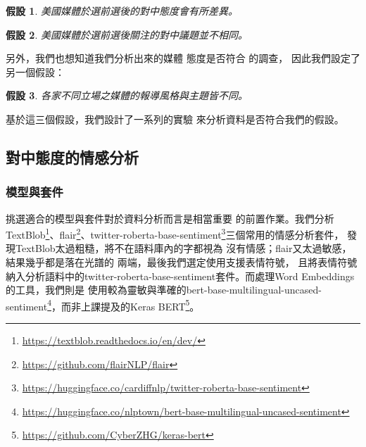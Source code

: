 \documentclass[12pt,twocolumn,letterpaper]{article}
\newtheorem{hyp}{假設}
\begin{document}
\begin{hyp}\label{hyp:attitude}
美國媒體於選前選後的對中態度會有所差異。
\end{hyp}
\begin{hyp}\label{hyp:topic}
美國媒體於選前選後關注的對中議題並不相同。
\end{hyp}

另外，我們也想知道我們分析出來的媒體
態度是否符合\cite{press} 的調查，
因此我們設定了另一個假設：
\begin{hyp}\label{hyp:press}
各家不同立場之媒體的報導風格與主題皆不同。
\end{hyp}

基於這三個假設，我們設計了一系列的實驗
來分析資料是否符合我們的假設。

\subsection{對中態度的情感分析}\label{subsec:sent}
\subsubsection{模型與套件}
挑選適合的模型與套件對於資料分析而言是相當重要
的前置作業。我們分析TextBlob\footnote{\url{https://textblob.readthedocs.io/en/dev/}}、flair\footnote{\url{https://github.com/flairNLP/flair}}、twitter-roberta-base-sentiment\footnote{\url{https://huggingface.co/cardiffnlp/twitter-roberta-base-sentiment}}三個常用的情感分析套件，
發現TextBlob太過粗糙，將不在語料庫內的字都視為
沒有情感；flair又太過敏感，結果幾乎都是落在光譜的
兩端，最後我們選定使用支援表情符號，
且將表情符號納入分析語料中的twitter-roberta-base-sentiment套件。而處理Word Embeddings的工具，我們則是
使用較為靈敏與準確的bert-base-multilingual-uncased-sentiment\footnote{\url{https://huggingface.co/nlptown/bert-base-multilingual-uncased-sentiment}}，而非上課提及的Keras BERT\footnote{\url{https://github.com/CyberZHG/keras-bert}}。
\end{document}
